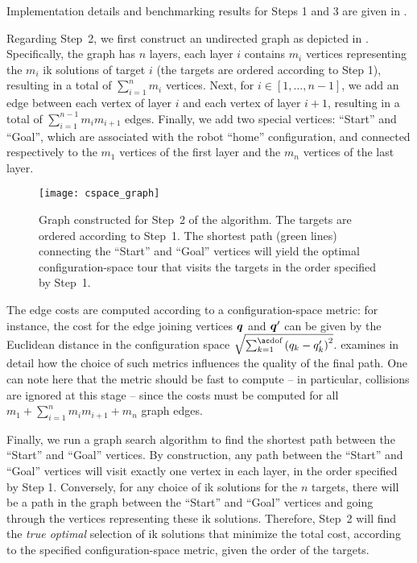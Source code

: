 Implementation details and benchmarking results for Steps 1 and 3 are given in .

Regarding Step~2, we first construct an undirected graph as depicted in
. Specifically, the graph has $n$ layers, each layer $i$
contains $m_i$ vertices representing the $m_i$ \ac{ik} solutions of target $i$
(the targets are ordered according to Step 1), resulting in a total of
$\sum_{i=1}^{n}{m_i}$ vertices. Next, for $i\in[1,\dots,n-1]$, we add an edge
between each vertex of layer $i$ and each vertex of layer $i+1$, resulting in a
total of $\sum_{i=1}^{n-1}{m_{i}m_{i+1}}$ edges. Finally, we add two special
vertices: \enquote{Start} and \enquote{Goal}, which are associated with the
robot \enquote{home} configuration, and connected respectively to the $m_1$
vertices of the first layer and the $m_n$ vertices of the last layer.

\begin{figure}[t]
  \centering
  \vspace*{2mm}
  \texttt{[image: cspace\_graph]}
  \caption{Graph constructed for Step~2 of the algorithm. The targets are
  ordered according to Step~1. The shortest path (green lines) connecting the
  \enquote{Start} and \enquote{Goal} vertices will yield the optimal
  configuration-space tour that visits the targets in the order specified by
  Step~1.}
  \label{fig:cspace_graph}
\end{figure}

The edge costs are computed according to a configuration-space metric: for
instance, the cost for the edge joining vertices $\vb*{q}$ and $\vb*{q}'$
can be given by the Euclidean distance in the configuration space
$\sqrt{\sum_{k=1}^{\mdof}\qty(q_{k}-q'_{k})^2}$. 
examines in detail how the choice of such metrics influences the quality of the
final path. One can note here that the metric should be fast to compute -- in
particular, collisions are ignored at this stage -- since the costs must be
computed for all $m_{1} + \sum_{i=1}^{n}{m_{i}m_{i+1}} + m_{n}$ graph edges.

Finally, we run a graph search algorithm to find the shortest path between the
\enquote{Start} and \enquote{Goal} vertices. By construction, any path between
the \enquote{Start} and \enquote{Goal} vertices will visit exactly one vertex in
each layer, in the order specified by Step 1. Conversely, for any choice of
\ac{ik} solutions for the $n$ targets, there will be a path in the graph between
the \enquote{Start} and \enquote{Goal} vertices and going through the vertices
representing these \ac{ik} solutions. Therefore, Step~2 will find the \emph{true
optimal} selection of \ac{ik} solutions that minimize the total cost, according
to the specified configuration-space metric, given the order of the targets.

